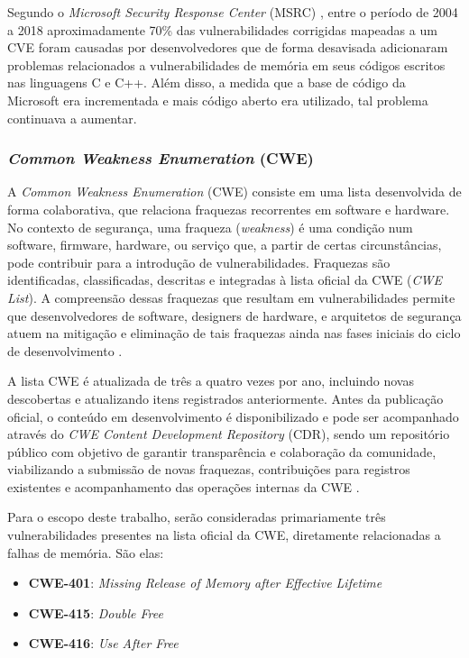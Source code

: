 \documentclass[
    12pt,                %
    openright,           %
    oneside,             %
    a4paper,             %
    english,             %
    brazil               %
]{abntex2}
\begin{document}
\par
Segundo o \textit{Microsoft Security Response Center} (MSRC) \cite{MSRC2019}, entre o período de 2004 a 2018 aproximadamente 70\% das vulnerabilidades corrigidas mapeadas a um CVE foram causadas por desenvolvedores 
que de forma desavisada adicionaram problemas relacionados a vulnerabilidades de memória em seus códigos escritos nas linguagens C e C++. Além disso, a medida que a base de código da Microsoft era incrementada e 
mais código aberto era utilizado, tal problema continuava a aumentar.

\subsubsection{\textit{Common Weakness Enumeration} (CWE)}
\label{subsec:cwe}

A \textit{Common Weakness Enumeration} (CWE) consiste em uma lista desenvolvida de forma colaborativa, que relaciona fraquezas recorrentes em software e hardware. No contexto de segurança, 
uma fraqueza (\textit{weakness}) é uma condição num software, firmware, hardware, ou serviço que, a partir de certas circunstâncias, pode contribuir para a introdução de vulnerabilidades. Fraquezas são identificadas, 
classificadas, descritas e integradas à lista oficial da CWE (\textit{CWE List}). A compreensão dessas fraquezas que resultam em vulnerabilidades permite que desenvolvedores de software, designers de hardware, 
e arquitetos de segurança atuem na mitigação e eliminação de tais fraquezas ainda nas fases iniciais do ciclo de desenvolvimento \cite{Cwe2026}. 
\par
A lista CWE é atualizada de três a quatro vezes por ano, incluindo novas descobertas e atualizando itens registrados anteriormente. Antes da publicação oficial, o conteúdo em desenvolvimento é 
disponibilizado e pode ser acompanhado através do \textit{CWE Content Development Repository} (CDR), sendo um repositório público com objetivo de garantir transparência e colaboração da comunidade, viabilizando a 
submissão de novas fraquezas, contribuições para registros existentes e acompanhamento das operações internas da CWE \cite{Cwe2026}.

\par
Para o escopo deste trabalho, serão consideradas primariamente três vulnerabilidades presentes na lista oficial da CWE, diretamente relacionadas a falhas de memória. São elas:
\begin{itemize}
    \item \textbf{CWE-401}: \textit{Missing Release of Memory after Effective Lifetime}
    \item \textbf{CWE-415}: \textit{Double Free}
    \item \textbf{CWE-416}: \textit{Use After Free}
\end{itemize}
\end{document}
